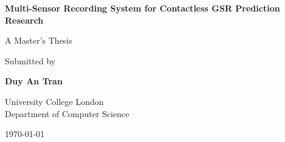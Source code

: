 \documentclass[11pt,a4paper]{report}
\begin{document}
\begin{titlepage}
\centering
\vspace*{2cm}

{\LARGE\textbf{Multi-Sensor Recording System for Contactless GSR Prediction Research}}

\vspace{1.5cm}

{\Large A Master's Thesis}

\vspace{1cm}

{\large Submitted by}

\vspace{0.5cm}

{\Large\textbf{Duy An Tran}}

\vspace{2cm}

{\large University College London\\
Department of Computer Science}

\vspace{1cm}

{\large \today}
\end{titlepage}

\tableofcontents
\newpage









\appendix


% 
% 



\end{document}
